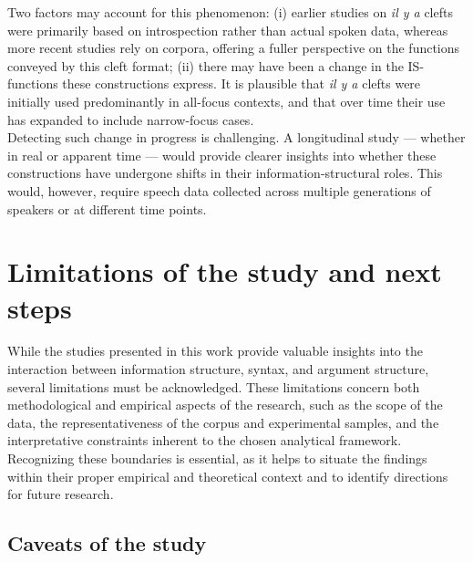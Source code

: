Two factors may account for this phenomenon: (i) earlier studies on \textit{il y a} clefts were primarily based on introspection rather than actual spoken data, whereas more recent studies rely on corpora, offering a fuller perspective on the functions conveyed by this cleft format; (ii) there may have been a change in the IS-functions these constructions express. It is plausible that \textit{il y a} clefts were initially used predominantly in all-focus contexts, and that over time their use has expanded to include narrow-focus cases.\\
Detecting such change in progress is challenging. A longitudinal study — whether in real or apparent time — would provide clearer insights into whether these constructions have undergone shifts in their information-structural roles. This would, however, require speech data collected across multiple generations of speakers or at different time points.

\section{Limitations of the study and next steps}

While the studies presented in this work provide valuable insights into the interaction between information structure, syntax, and argument structure, several limitations must be acknowledged. These limitations concern both methodological and empirical aspects of the research, such as the scope of the data, the representativeness of the corpus and experimental samples, and the interpretative constraints inherent to the chosen analytical framework. Recognizing these boundaries is essential, as it helps to situate the findings within their proper empirical and theoretical context and to identify directions for future research. 

\subsection{Caveats of the study}

